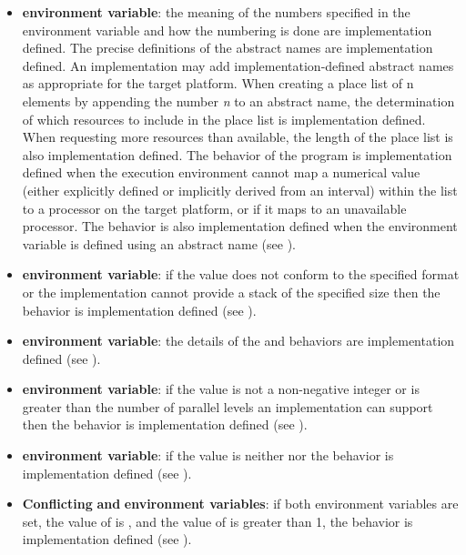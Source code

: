\begin{itemize}
\item {} \textbf{environment variable}: the meaning of the numbers specified in the
environment variable and how the numbering is done are implementation defined.
The precise definitions of the abstract names are implementation defined. An
implementation may add implementation-defined abstract names as appropriate for
the target platform. When creating a place list of n elements by appending the
number \emph{n} to an abstract name, the determination of which resources to include in the
place list is implementation defined. When requesting more resources than available,
the length of the place list is also implementation defined. The behavior of the
program is implementation defined when the execution environment cannot map a
numerical value (either explicitly defined or implicitly derived from an interval)
within the  list to a processor on the target platform, or if it maps to an
unavailable processor. The behavior is also implementation defined when the
 environment variable is defined using an abstract name (see ).

\item {} \textbf{environment variable}: if the value does not conform to the
specified format or the implementation cannot provide a stack of the specified size
then the behavior is implementation defined (see ).

\item {} \textbf{environment variable}: the details of the  and
 behaviors are implementation defined (see ).

\item {} \textbf{environment variable}: if the value is not a
non-negative integer or is greater than the number of parallel levels an implementation
can support then the behavior is implementation defined (see ).

\item {} \textbf{environment variable}: if the value is neither
 nor  the behavior is implementation defined (see
).

\item \textbf{Conflicting }  \textbf{and}  \textbf{environment
variables}: if both environment variables are set, the value of  is
, and the value of  is greater
than 1, the behavior is implementation defined (see ).


\end{itemize}
